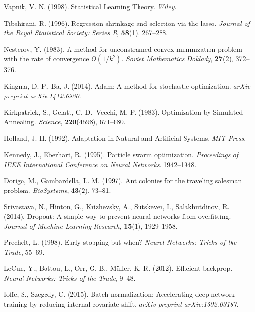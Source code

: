 \begin{itemize}
\begin{thebibliography}{}
			Vapnik, V. N. (1998). Statistical Learning Theory.
			\textit{Wiley}.
			
			Tibshirani, R. (1996). Regression shrinkage and selection via the lasso.
			\textit{Journal of the Royal Statistical Society: Series B}, \textbf{58}(1), 267--288.
			
			Nesterov, Y. (1983). A method for unconstrained convex minimization problem with the rate of convergence \(O(1/k^2)\).
			\textit{Soviet Mathematics Doklady}, \textbf{27}(2), 372--376.
			
			Kingma, D. P., Ba, J. (2014). Adam: A method for stochastic optimization.
			\textit{arXiv preprint arXiv:1412.6980}.
			
			Kirkpatrick, S., Gelatt, C. D., Vecchi, M. P. (1983). Optimization by Simulated Annealing.
			\textit{Science}, \textbf{220}(4598), 671--680.
			
			Holland, J. H. (1992). Adaptation in Natural and Artificial Systems.
			\textit{MIT Press}.
			
			Kennedy, J., Eberhart, R. (1995). Particle swarm optimization.
			\textit{Proceedings of IEEE International Conference on Neural Networks}, 1942--1948.
			
			Dorigo, M., Gambardella, L. M. (1997). Ant colonies for the traveling salesman problem.
			\textit{BioSystems}, \textbf{43}(2), 73--81.
			
			Srivastava, N., Hinton, G., Krizhevsky, A., Sutskever, I., Salakhutdinov, R. (2014). Dropout: A simple way to prevent neural networks from overfitting.
			\textit{Journal of Machine Learning Research}, \textbf{15}(1), 1929--1958.
			
			Prechelt, L. (1998). Early stopping-but when?
			\textit{Neural Networks: Tricks of the Trade}, 55--69.
			
			LeCun, Y., Bottou, L., Orr, G. B., Müller, K.-R. (2012). Efficient backprop.
			\textit{Neural Networks: Tricks of the Trade}, 9--48.
			
			Ioffe, S., Szegedy, C. (2015). Batch normalization: Accelerating deep network training by reducing internal covariate shift.
			\textit{arXiv preprint arXiv:1502.03167}.
			

\end{thebibliography}
\end{itemize}
